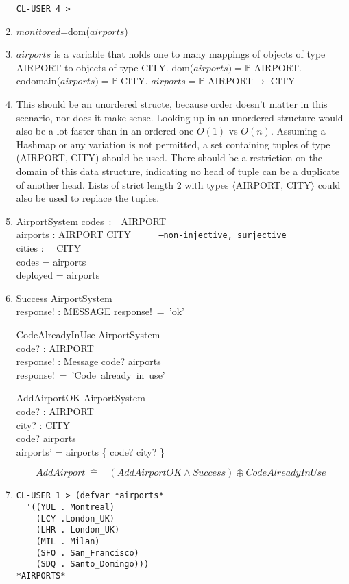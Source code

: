 \documentclass[12pt]{article}
\begin{document}
\begin{enumerate}
\begin{verbatim}
CL-USER 4 > 
\end{verbatim}
\item $monitored$=dom($airports$)
\item $airports$ is a variable that holds one to many mappings of objects of type AIRPORT to objects of type CITY. dom($airports)=\mathbb{P}$ AIRPORT. codomain($airports)= \mathbb{P}$ CITY. $airports = \mathbb{P}$ AIRPORT$\mapsto$ CITY
\item This should be an unordered structe, because order doesn't matter in this scenario, nor does it make sense. Looking up in an unordered structure would also be a lot faster than in an ordered one $O(1)$ vs $O(n)$. Assuming a Hashmap or any variation is not permitted, a set containing tuples of type (AIRPORT, CITY) should be used. There should be a restriction on the domain of this data structure, indicating no head of tuple can be a duplicate of another head. Lists of strict length 2 with types $\langle$AIRPORT, CITY$\rangle$ could also be used to replace the tuples.
\newpage
\item 
\begin{schema}{AirportSystem}
codes~:~~AIRPORT\\
airports : AIRPORT \rightarrow CITY \texttt{~~~~~--non-injective, surjective}\\
cities : ~~CITY\\
\where
codes = \dom airports\\
deployed = \ran airports
\end{schema}
\item
\begin{schema}{Success}
\Xi AirportSystem\\
response! : MESSAGE
\where
response!~=~'ok'\\
\end{schema}
\begin{schema}{CodeAlreadyInUse}
\Xi AirportSystem\\
code? : AIRPORT\\
response! : Message
\ST
code? \in \dom airports\\
response!~=~'Code~already~in~use'
\end{schema}

\begin{schema}{AddAirportOK}
\Delta AirportSystem\\
code? : AIRPORT\\
city? : CITY\\
\where
code? \notin \dom airports\\
airports' = airports \cup \{ code? \mapsto city? \}\\
\end{schema}
\[ AddAirport~\hat{=}~~~~(AddAirportOK\wedge Success) \oplus CodeAlreadyInUse\]
\item
\begin{verbatim}
CL-USER 1 > (defvar *airports*
  '((YUL . Montreal)
    (LCY .London_UK)
    (LHR . London_UK)
    (MIL . Milan)
    (SFO . San_Francisco)
    (SDQ . Santo_Domingo)))
*AIRPORTS*


\end{verbatim}
\end{enumerate}
\end{document}
